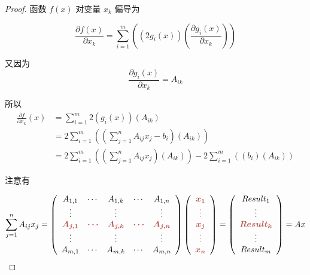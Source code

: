 \begin{proof}
    函数 $ f(x) $ 对变量 $ x_{k} $ 偏导为
    
    $$ \frac{\partial f(x)}{\partial x_{k}}=\sum_{i=1}^{m}\left(\left(2 g_{i}(x)\right)\left(\frac{\partial g_{i}(x)}{\partial x_{k}}\right)\right) $$


    又因为
    $$ \frac{\partial g_{i}(x)}{\partial x_{k}}=A_{i k} $$


    所以
    $$ \begin{aligned} 
        \frac{\partial f}{\partial x_{k}}(x) 
        &=\sum_{i=1}^{m} 2\left(g_{i}(x)\right)\left(A_{i k}\right) \\
        &=2 \sum_{i=1}^{m}\left(\left(\sum_{j=1}^{n} A_{i j} x_{j}-b_{i}\right)\left(A_{i k}\right)\right) 
        \\ &=2 \sum_{i=1}^{m}\left(\left(\sum_{j=1}^{n} A_{i j} x_{j}\right)\left(A_{i k}\right)\right)-2 \sum_{i=1}^{m}\left(\left(b_{i}\right)\left(A_{i k}\right)\right) \end{aligned} $$

    注意有
        

    $$\sum\limits _{j=1}^{n} A_{ij} x_{j} =\left(\begin{array}{ c c c c c }
    A_{1,1} & \cdots  & A_{1,k} & \cdots  & A_{1,n}\\
    \vdots  &  & \vdots  &  & \vdots \\
    \boldsymbol{\textcolor[rgb]{0.72,0.33,0.31}{A}\textcolor[rgb]{0.72,0.33,0.31}{_{j,1}}} & \boldsymbol{\textcolor[rgb]{0.72,0.33,0.31}{\cdots }} & \boldsymbol{\textcolor[rgb]{0.72,0.33,0.31}{A}\textcolor[rgb]{0.72,0.33,0.31}{_{j,k}}} & \boldsymbol{\textcolor[rgb]{0.72,0.33,0.31}{\cdots }} & \boldsymbol{\textcolor[rgb]{0.72,0.33,0.31}{A}\textcolor[rgb]{0.72,0.33,0.31}{_{j,n}}}\\
    \vdots  &  & \vdots  &  & \vdots \\
    A_{m,1} & \cdots  & A_{m,k} & \cdots  & A_{m,n}
    \end{array}\right)\left(\begin{array}{ c }
    \boldsymbol{\textcolor[rgb]{0.72,0.33,0.31}{x}\textcolor[rgb]{0.72,0.33,0.31}{_{1}}}\\
    \boldsymbol{\textcolor[rgb]{0.72,0.33,0.31}{\vdots }}\\
    \boldsymbol{\textcolor[rgb]{0.72,0.33,0.31}{x}\textcolor[rgb]{0.72,0.33,0.31}{_{j}}}\\
    \boldsymbol{\textcolor[rgb]{0.72,0.33,0.31}{\vdots }}\\
    \boldsymbol{\textcolor[rgb]{0.72,0.33,0.31}{x}\textcolor[rgb]{0.72,0.33,0.31}{_{n}}}
    \end{array}\right) =\left(\begin{array}{ c }
    Result_{1}\\
    \vdots \\
    \boldsymbol{\textcolor[rgb]{0.72,0.33,0.31}{Result}\textcolor[rgb]{0.72,0.33,0.31}{_{k}}}\\
    \vdots \\
    Result_{m}
    \end{array}\right) =Ax$$


\end{proof}
